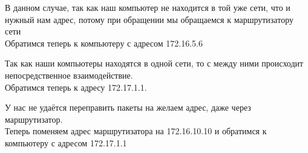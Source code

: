 \documentclass[a4paper,12pt]{article}
\begin{document}
В данном случае, так как наш компьютер не находится в той уже сети, что и нужный нам адрес, 
потому при обращении мы обращаемся к маршрутизатору сети\\
Обратимся теперь к компьютеру с адресом 172.16.5.6
\begin{figure}[H]
\end{figure}
Так как наши компьютеры находятся в одной сети, то с между ними происходит 
непосредственное взаимодействие.\\
Обратимся теперь к адресу 172.17.1.1.
\begin{figure}[H]
\end{figure}
У нас не удаётся переправить пакеты на желаем адрес, даже через маршрутизатор.\\
Теперь поменяем адрес маршрутизатора на 172.16.10.10 и обратимся к 
компьютеру с адресом 172.17.1.1
\begin{figure}[H]
\end{figure}
\end{document}
